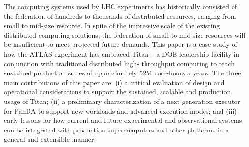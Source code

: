 The computing systems used by LHC experiments has historically consisted of
the federation of hundreds to thousands of distributed resources, ranging
from small to mid-size resource.  In spite of the impressive scale of the
existing distributed computing solutions, the federation of small to mid-size
resources will be insufficient to meet projected future demands. This paper
is a case study of how the ATLAS experiment has embraced Titan -- a DOE
leadership facility in conjunction with traditional distributed high-
throughput computing to reach sustained production scales of approximately
52M core-hours a years. The three main contributions of this paper are:  (i)
a critical evaluation of design and operational considerations  to support
the sustained, scalable and production usage of Titan;  (ii) a preliminary
characterization of a next generation executor for PanDA to support new
workloads and  advanced execution modes; and (iii) early lessons for how
current and future experimental and observational systems can be integrated
with production supercomputers and other platforms in a general and
extensible manner.